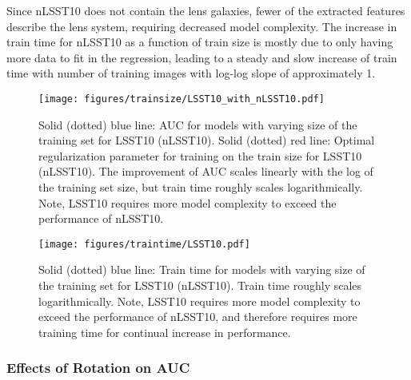 \documentclass{emulateapj}
\begin{document}
Since nLSST10 does not contain the lens galaxies, fewer of the
extracted features describe the lens system, requiring decreased model
complexity.  The increase in train time for nLSST10 as a function of
train size is mostly due to only having more data to fit in the
regression, leading to a steady and slow increase of train time with
number of training images with log-log slope of approximately 1.

\begin{figure}[t]
\begin{center}
\texttt{[image: figures/trainsize/LSST10\_with\_nLSST10.pdf]}
\caption{Solid (dotted) blue line: AUC for models with varying size of
  the training set for LSST10 (nLSST10).  Solid (dotted) red line:
  Optimal regularization parameter for training on the train size for
  LSST10 (nLSST10). The improvement of AUC scales linearly with the
  log of the training set size, but train time roughly scales
  logarithmically.  Note, LSST10 requires more model complexity to
  exceed the performance of nLSST10.}\label{fig:trainsizeLSST10}
\end{center}
\end{figure}

\begin{figure}[t]
\begin{center}
\texttt{[image: figures/traintime/LSST10.pdf]}
\caption{Solid (dotted) blue line: Train time for models with varying
  size of the training set for LSST10 (nLSST10).  Train time roughly
  scales logarithmically.  Note, LSST10 requires more model complexity
  to exceed the performance of nLSST10, and therefore requires more
  training time for continual increase in
  performance.}\label{fig:traintimeLSST10}
\end{center}
\end{figure}

\subsubsection{Effects of Rotation on AUC}
\end{document}
